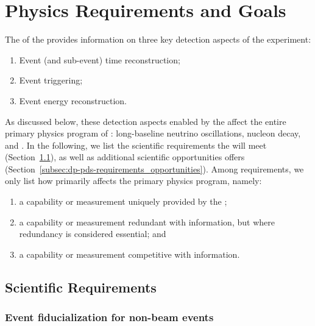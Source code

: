 \section{Physics Requirements and Goals}
\label{sec:dp-pds-requirements}

The  of the \dune {} provides information on three key detection aspects of the experiment:

\begin{enumerate}
\item Event (and sub-event) time reconstruction;
\item Event triggering;
\item Event energy reconstruction.
\end{enumerate}

As discussed below, these detection aspects enabled by the  affect the entire primary physics program of \dune: long-baseline neutrino oscillations, nucleon decay, and . In the following, we list the scientific requirements the  will meet  (Section~\ref{subsec:dp-pds-requirements_requirements}), as well as additional scientific opportunities  offers (Section~\ref{subsec:dp-pds-requirements_opportunities}). Among requirements, we only list how  primarily affects the \dune primary physics program, namely: 
\begin{enumerate}
\item a capability or measurement uniquely provided by the ;
\item a capability or measurement redundant with  information, but where redundancy is considered essential; and 
\item a capability or measurement competitive with  information.
\end{enumerate}


\subsection{Scientific Requirements}
\label{subsec:dp-pds-requirements_requirements}

\subsubsection{Event fiducialization for non-beam events}


